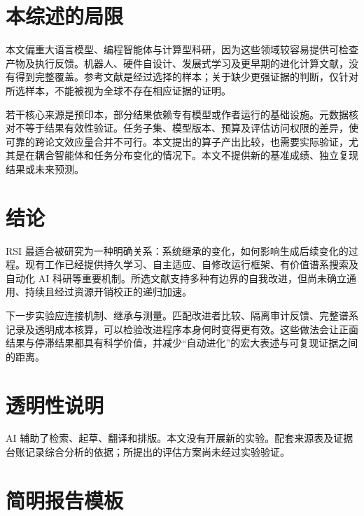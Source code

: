 \documentclass[11pt,,]{article}
\begin{document}
\hypertarget{ux672cux7efcux8ff0ux7684ux5c40ux9650}{%
\section{本综述的局限}\label{ux672cux7efcux8ff0ux7684ux5c40ux9650}}

本文偏重大语言模型、编程智能体与计算型科研，因为这些领域较容易提供可检查产物及执行反馈。机器人、硬件自设计、发展式学习及更早期的进化计算文献，没有得到完整覆盖。参考文献是经过选择的样本；关于缺少更强证据的判断，仅针对所选样本，不能被视为全球不存在相应证据的证明。

若干核心来源是预印本，部分结果依赖专有模型或作者运行的基础设施。元数据核对不等于结果有效性验证。任务子集、模型版本、预算及评估访问权限的差异，使可靠的跨论文效应量合并不可行。本文提出的算子产出比较，也需要实际验证，尤其是在耦合智能体和任务分布变化的情况下。本文不提供新的基准成绩、独立复现结果或未来预测。

\hypertarget{ux7ed3ux8bba}{%
\section{结论}\label{ux7ed3ux8bba}}

RSI
最适合被研究为一种明确关系：系统继承的变化，如何影响生成后续变化的过程。现有工作已经提供持久学习、自主适应、自修改运行框架、有价值谱系搜索及自动化
AI
科研等重要机制。所选文献支持多种有边界的自我改进，但尚未确立通用、持续且经过资源开销校正的递归加速。

下一步实验应连接机制、继承与测量。匹配改进者比较、隔离审计反馈、完整谱系记录及透明成本核算，可以检验改进程序本身何时变得更有效。这些做法会让正面结果与停滞结果都具有科学价值，并减少``自动进化''的宏大表述与可复现证据之间的距离。

\hypertarget{ux900fux660eux6027ux8bf4ux660e}{%
\section{透明性说明}\label{ux900fux660eux6027ux8bf4ux660e}}

AI
辅助了检索、起草、翻译和排版。本文没有开展新的实验。配套来源表及证据台账记录综合分析的依据；所提出的评估方案尚未经过实验验证。

\clearpage
\appendix

\hypertarget{ux7b80ux660eux62a5ux544aux6a21ux677f}{%
\section{简明报告模板}\label{ux7b80ux660eux62a5ux544aux6a21ux677f}}
\end{document}
